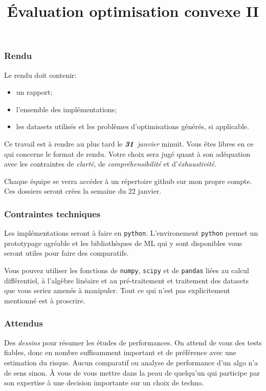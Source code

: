 \documentclass[11pt, a4paper]{article}
\title{%
  { \huge Évaluation optimisation convexe II}%
}
\author{}
\date{}
\begin{document}
\maketitle\thispagestyle{fancy}

\subsubsection*{Rendu}

Le rendu doit contenir:
\begin{itemize}
\item un rapport;
\item l'ensemble des implémentations;
\item les datasets utilisés et les problèmes d'optimisations générés, si applicable.
\end{itemize}
Ce travail est à rendre au plus tard le \emph{$\boldsymbol{\mathit{31}}$
  janvier} minuit. Vous êtes libres en ce qui concerne le format de
rendu. Votre choix sera jugé quant à son adéquation avec les
contraintes de \emph{clarté}, de \emph{compréhensibilité} et
d'\emph{éxhaustivité}.

Chaque équipe se verra accéder à un répertoire github sur mon propre
compte. Ces dossiers seront crées la semaine du 22 janvier.

\subsubsection*{Contraintes techniques}

Les implémentations seront à faire en \texttt{python}. L'environement
\texttt{python} permet un prototypage agréable et les bibliothèques de
ML qui y sont disponibles vous seront utiles pour faire des
comparatifs.

Vous pouvez utiliser les fonctions de \texttt{numpy}, \texttt{scipy}
et de \texttt{pandas} liées au calcul différentiel, à l'algèbre
linéaire et au pré-traitement et traitement des datasets que vous
seriez amenés à manipuler. Tout ce qui n'est pas explicitement
mentionné est à proscrire.

\subsubsection*{Attendus}

Des \emph{dessins} pour résumer les études de performances. On attend
de vous des tests fiables, donc en nombre suffisamment important et de
préférence avec une estimation du risque. Aucun comparatif ou analyse
de performance d'un algo n'a de sens sinon. À vous de vous mettre dans
la peau de quelqu'un qui participe par son expertise à une decision
importante sur un choix de techno.
\end{document}
